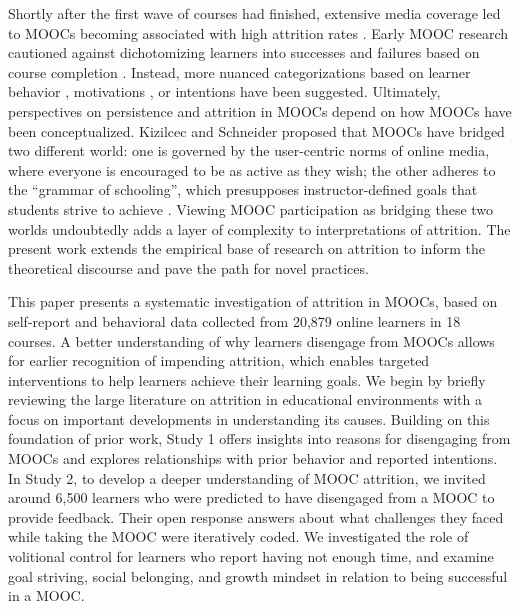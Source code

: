\documentclass{sigchi}\usepackage[]{graphicx}\usepackage[]{color}
\begin{document}
Shortly after the first wave of courses had finished, extensive media coverage led to MOOCs becoming associated with high attrition rates \cite{lewin2013after,parr2013mooc,guthrie2013moocs}. Early MOOC research cautioned against dichotomizing learners into successes and failures based on course completion \cite{kizilcec2013deconstructing,rivard2013measuring}. Instead, more nuanced categorizations based on learner behavior \cite{kizilcec2013deconstructing,clow2013moocs}, motivations \cite{kizilcec2015motivation}, or intentions \cite{wilkowski2014student} have been suggested. Ultimately, perspectives on persistence and attrition in MOOCs depend on how MOOCs have been conceptualized. Kizilcec and Schneider \citeyear{kizilcec2015motivation} proposed that MOOCs have bridged two different world: one is governed by the user-centric norms of online media, where everyone is encouraged to be as active as they wish; the other adheres to the ``grammar of schooling'', which presupposes instructor-defined goals that students strive to achieve \cite{tyack1994grammar}. Viewing MOOC participation as bridging these two worlds undoubtedly adds a layer of complexity to interpretations of attrition. The present work extends the empirical base of research on attrition to inform the theoretical discourse and pave the path for novel practices.

This paper presents a systematic investigation of attrition in MOOCs, based on self-report and behavioral data collected from 20,879 online learners in 18 courses. A better understanding of why learners disengage from MOOCs allows for earlier recognition of impending attrition, which enables targeted interventions to help learners achieve their learning goals. We begin by briefly reviewing the large literature on attrition in educational environments with a focus on important developments in understanding its causes. Building on this foundation of prior work, Study 1 offers insights into reasons for disengaging from MOOCs and explores relationships with prior behavior and reported intentions. In Study 2, to develop a deeper understanding of MOOC attrition, we invited around 6,500 learners who were predicted to have disengaged from a MOOC to provide feedback. Their open response answers about what challenges they faced while taking the MOOC were iteratively coded. We investigated the role of volitional control for learners who report having not enough time, and examine goal striving, social belonging, and growth mindset in relation to being successful in a MOOC.
\end{document}
